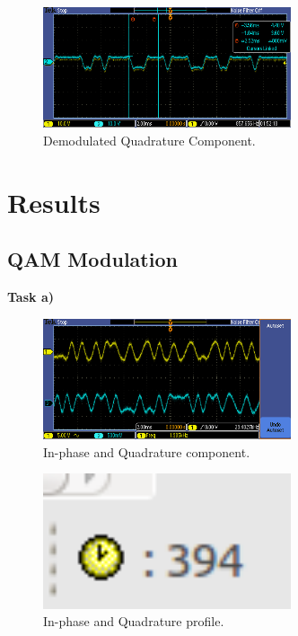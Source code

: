 \documentclass{article}
\begin{document}
\begin{figure}[h]
  \begin{center}
    \includegraphics[width=0.65\textwidth]{img/task_2_c_oscilloscope.png}
    \caption{Demodulated Quadrature Component.}
  \end{center}
\end{figure}

\pagebreak

\pagebreak
\section{Results}

\subsection{QAM Modulation}

\textbf{Task a)}
\begin{figure}[h]
  \begin{center}
    \includegraphics[width=0.65\textwidth]{img/task_a_oscilloscope.png}
    \caption{In-phase and Quadrature component.}
  \end{center}
\end{figure}

\begin{figure}[h]
  \begin{center}
    \includegraphics[width=0.65\textwidth]{img/task_a_profile.png}
    \caption{In-phase and Quadrature profile.}
  \end{center}
\end{figure}
\end{document}
